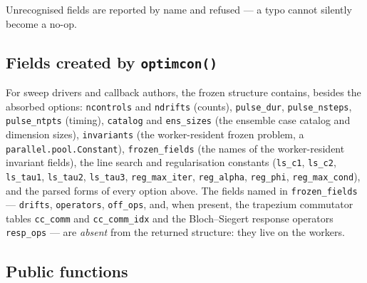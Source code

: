 \documentclass[11pt,a4paper]{article}
\newcommand{\code}[1]{\texttt{#1}}
\begin{document}
Unrecognised fields are reported by name and refused --- a typo cannot
silently become a no-op.

\subsection{Fields created by \code{optimcon()}}

For sweep drivers and callback authors, the frozen structure contains,
besides the absorbed options: \code{ncontrols} and \code{ndrifts}
(counts), \code{pulse\_dur}, \code{pulse\_nsteps}, \code{pulse\_ntpts}
(timing), \code{catalog} and
\code{ens\_sizes} (the ensemble case catalog and dimension sizes),
\code{invariants} (the worker-resident frozen problem,
a \code{parallel.pool.Constant}), \code{frozen\_fields} (the names of
the worker-resident invariant fields), the line search and regularisation
constants (\code{ls\_c1}, \code{ls\_c2}, \code{ls\_tau1},
\code{ls\_tau2}, \code{ls\_tau3}, \code{reg\_max\_iter},
\code{reg\_alpha}, \code{reg\_phi}, \code{reg\_max\_cond}), and the
parsed forms of every option above. The fields named in
\code{frozen\_fields} --- \code{drifts}, \code{operators},
\code{off\_ops}, and, when present, the trapezium commutator tables
\code{cc\_comm} and \code{cc\_comm\_idx} and the Bloch--Siegert
response operators \code{resp\_ops} --- are \emph{absent} from the
returned structure: they live on the workers.

\subsection{Public functions}
\end{document}
